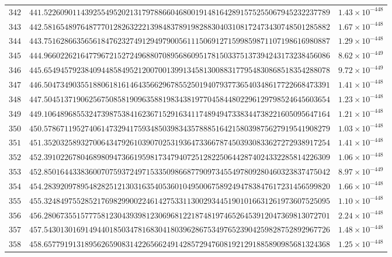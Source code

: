 \documentclass[12pt,reqno]{amsart}
\theoremstyle{remark}
\begin{document}
\begin{longtable}{clc}
$342$ & $441.5226090114392554952021317978866046800191481642891575255067945232237789$ & $1.43\times 10^{-448}$ \\
$343$ & $442.5816548976487770128263222139848378919828830403108172473430748501285882$ & $1.67\times 10^{-448}$ \\
$344$ & $443.7516286635656184762327491294979005611150691271599859871107198616980887$ & $1.29\times 10^{-448}$ \\
$345$ & $444.9660226216477967215272496880708956860951781503375137394243173238456086$ & $8.62\times 10^{-449}$ \\
$346$ & $445.6549457923840944858495212007001399134581300883177954830868518354288078$ & $9.72\times 10^{-449}$ \\
$347$ & $446.5047349035518806181614643566296785525019407937736540348617722668473391$ & $1.41\times 10^{-448}$ \\
$348$ & $447.5045137190625675085819096358819834381977045844802296129798524645603654$ & $1.23\times 10^{-448}$ \\
$349$ & $449.1064896855324739875384162367152916341174894947338344738221605095647164$ & $1.21\times 10^{-448}$ \\
$350$ & $450.5786711952740614732941759348503983435788851642158039875627919541908279$ & $1.03\times 10^{-448}$ \\
$351$ & $451.3520325893270064347926103907025319364733667874503930833627272938917254$ & $1.41\times 10^{-448}$ \\
$352$ & $452.3910226780468980947366195981734794072512822506442874024332285814226309$ & $1.06\times 10^{-448}$ \\
$353$ & $452.8501644338360070759372497153350986687790973455497809280460323837475042$ & $8.97\times 10^{-449}$ \\
$354$ & $454.2839209789548282512130316354053601049500675892494783847617231456599820$ & $1.66\times 10^{-448}$ \\
$355$ & $455.3248497552852176982990022461427533113002934451901016631261973607525095$ & $1.10\times 10^{-448}$ \\
$356$ & $456.2806735515777581230439398123069681221874819746526453912047369813072701$ & $2.24\times 10^{-448}$ \\
$357$ & $457.5430130169149440185034781683041803962867534976523904259828752892967726$ & $1.48\times 10^{-448}$ \\
$358$ & $458.6577919131895626590831422656624914285729476081921291885890985681324368$ & $1.25\times 10^{-448}$ \\

\end{longtable}
\end{document}
